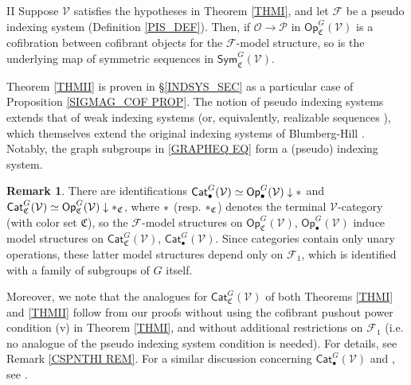 \documentclass[a4paper,10pt
]{article}%
\numberwithin{equation}{section}
\numberwithin{figure}{section}
\theoremstyle{definition} %
\newtheorem{remark}[equation]{Remark}%
\newcommand{\Sym}{\ensuremath{\mathsf{Sym}}}%
\newcommand{\Cat}{\mathsf{Cat}}
\newcommand{\Op}{\mathsf{Op}}%
\newcommand{\F}{\ensuremath{\mathcal F}}
\newcommand{\V}{\ensuremath{\mathcal V}}
\renewcommand{\O}{\ensuremath{\mathcal O}}
\newcommand{\1}{\ensuremath{\mathbbm 1}}%
\begin{document}
\begin{customthm}{II}\label{THMII}
	Suppose $\V$ satisfies the hypotheses in Theorem \ref{THMI},
	and let $\F$ be a pseudo indexing system (Definition \ref{PIS_DEF}).
	Then, if $\O \to \mathcal{P}$ in $\Op^G_{\mathfrak{C}}(\V)$ is a cofibration between cofibrant objects for the $\F$-model structure,
	so is the underlying
	map of symmetric sequences in $\Sym^G_{\mathfrak{C}}(\V)$.
\end{customthm}


Theorem \ref{THMII} is proven in \S \ref{INDSYS_SEC}
as a particular case of Proposition \ref{SIGMAG_COF PROP}.
The notion of pseudo indexing systems
extends that of weak indexing systems \cite[Def. 4.58]{BP21}
(or, equivalently, realizable sequences \cite[Def. 4.6]{GW18}),
which themselves extend the original 
indexing systems of Blumberg-Hill \cite{BH15}.
Notably, the graph subgroups in \eqref{GRAPHEQ EQ} form a (pseudo) indexing system.



\begin{remark}\label{RESTTOCATS REM}
	There are identifications
	$\Cat_\bullet^G(\V) \simeq \Op_\bullet^G(\V) \downarrow \**$ and
	$\Cat_{\mathfrak C}^G(\V) \simeq \Op_{\mathfrak C}^G(\V) \downarrow \**_{\mathfrak C}$,
	where $\**$ (resp. $\**_{\mathfrak C}$) denotes the terminal $\V$-category (with color set $\mathfrak C$),
	so the $\F$-model structures on $\Op_{\mathfrak C}^G(\V)$, $\Op_\bullet^G(\V)$
	induce model structures on $\Cat_{\mathfrak C}^G(\V)$, $\Cat_\bullet^G(\V)$.
	Since categories contain only unary operations,
	these latter model structures depend only on $\F_1$,
	which is identified with a family of subgroups of $G$ itself.

	Moreover, we note that the analogues 
	for $\Cat_{\mathfrak C}^G(\V)$
	of both Theorems \ref{THMI} and \ref{THMII}
	follow from our proofs without using
	the cofibrant pushout power condition (v)
	in Theorem \ref{THMI},
	and without additional restrictions on $\F_1$
	(i.e. no analogue of the pseudo indexing system condition  is needed).
	For details, see Remark \ref{CSPNTHI REM}.
	For a similar discussion concerning
	$\Cat_\bullet^G(\V)$ and
	\cite[Thm. \ref{AC-THMA}]{BP_ACOP},
	see \cite[Rem. \ref{AC-RESTTOCATS REM}]{BP_ACOP}.
\end{remark}
\end{document}
